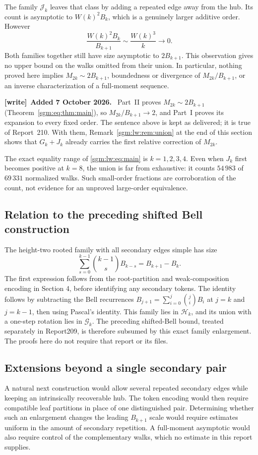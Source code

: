 \documentclass[11pt,letterpaper]{article}
\theoremstyle{remark}\newtheorem{remark}[theorem]{Remark}
\newcommand{\Gc}{\mathcal G}\newcommand{\Hc}{\mathcal H}\newcommand{\Jc}{\mathcal J}
\newenvironment{writenote}[1][]{\par\smallskip\begingroup\small
 \noindent\textbf{[write]}\if\relax\detokenize{#1}\relax\else~\textbf{#1.}\fi\ }%
 {\par\endgroup\smallskip}
\theoremstyle{definition}\newtheorem{definition}[theorem]{Definition}
\begin{document}
The family $\Jc_k$ leaves that class by adding a repeated edge away from the hub. Its count is asymptotic to $W(k)^2B_k$, which is a genuinely larger additive order. However
\[
 \frac{W(k)^2B_k}{B_{k+1}}\sim\frac{W(k)^3}{k}\longrightarrow0.
\]
Both families together still have size asymptotic to $2B_{k+1}$. This observation gives no upper bound on the walks omitted from their union. In particular, nothing proved here implies $M_{2k}\sim2B_{k+1}$, boundedness or divergence of $M_{2k}/B_{k+1}$, or an inverse characterization of a full-moment sequence.
\begin{writenote}[Added 7 October 2026]
Part~II proves $M_{2k}\sim2B_{k+1}$ (Theorem~\ref{sgm:eq:thm:main}), so $M_{2k}/B_{k+1}\to2$, and Part~I proves its expansion to every fixed order. The sentence above is kept as delivered; it is true of Report~210. With them, Remark~\ref{sgm:lw:rem:union} at the end of this section shows that $G_k+J_k$ already carries the first relative correction of $M_{2k}$.
\end{writenote}

The exact equality range of \eqref{sgm:lw:eq:main} is $k=1,2,3,4$. Even when $J_k$ first becomes positive at $k=8$, the union is far from exhaustive: it counts $54\,983$ of $69\,331$ normalized walks. Such small-order fractions are corroboration of the count, not evidence for an unproved large-order equivalence.

\subsection{Relation to the preceding shifted Bell construction}
The height-two rooted family with all secondary edges simple has size
\[
 \sum_{s=0}^{k-1}\binom{k-1}{s}B_{k-s}=B_{k+1}-B_k.
\]
The first expression follows from the root-partition and weak-composition encoding in Section 4, before identifying any secondary tokens. The identity follows by subtracting the Bell recurrences $B_{j+1}=\sum_{i=0}^j\binom jiB_i$ at $j=k$ and $j=k-1$, then using Pascal's identity. This family lies in $\Hc_k$, and its union with a one-step rotation lies in $\Gc_k$. The preceding shifted-Bell bound, treated separately in Report209, is therefore subsumed by this exact family enlargement. The proofs here do not require that report or its files.

\subsection{Extensions beyond a single secondary pair}
A natural next construction would allow several repeated secondary edges while keeping an intrinsically recoverable hub. The token encoding would then require compatible leaf partitions in place of one distinguished pair. Determining whether such an enlargement changes the leading $B_{k+1}$ scale would require estimates uniform in the amount of secondary repetition. A full-moment asymptotic would also require control of the complementary walks, which no estimate in this report supplies.
\end{document}
